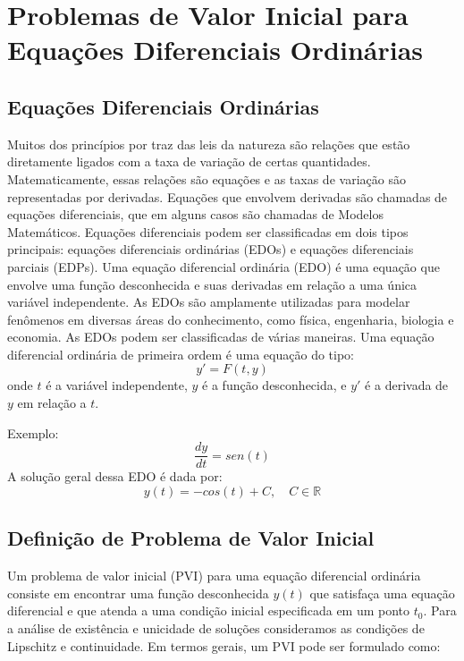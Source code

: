 \chapter{Problemas de Valor Inicial para Equações Diferenciais Ordinárias}

\section{Equações Diferenciais Ordinárias}
Muitos dos princípios por traz das leis da natureza são relações que estão diretamente ligados com a taxa de variação de certas quantidades. Matematicamente, essas relações são equações e as taxas de variação são representadas por derivadas. Equações que envolvem derivadas são chamadas de equações diferenciais, que em alguns casos são chamadas de Modelos Matemáticos. Equações diferenciais podem ser classificadas em dois tipos principais: equações diferenciais ordinárias (EDOs) e equações diferenciais parciais (EDPs).
Uma equação diferencial ordinária (EDO) é uma equação que envolve uma função desconhecida e suas derivadas em relação a uma única variável independente. As EDOs são amplamente utilizadas para modelar fenômenos em diversas áreas do conhecimento, como física, engenharia, biologia e economia. As EDOs podem ser classificadas de várias maneiras. Uma equação diferencial ordinária de primeira ordem é uma equação do tipo:
\begin{equation}
    y' = F\left(t, y\right)
\end{equation}
onde $t$ é a variável independente, $y$ é a função desconhecida, e
$y'$ é a derivada de $y$ em relação a $t$.

Exemplo:
\begin{equation}
    \frac{dy}{dt} = sen(t)
\end{equation}
A solução geral dessa EDO é dada por:
\begin{equation}
    y(t) = -cos(t) + C, \quad C \in \mathbb{R}
\end{equation}

\section{Definição de Problema de Valor Inicial}
Um problema de valor inicial (PVI) para uma equação diferencial ordinária consiste em encontrar uma função desconhecida $y(t)$ que satisfaça uma equação diferencial e que atenda a uma condição inicial especificada em um ponto $t_0$. Para a análise de existência e unicidade de soluções consideramos as condições de Lipschitz e continuidade. Em termos gerais, um PVI pode ser formulado como:


